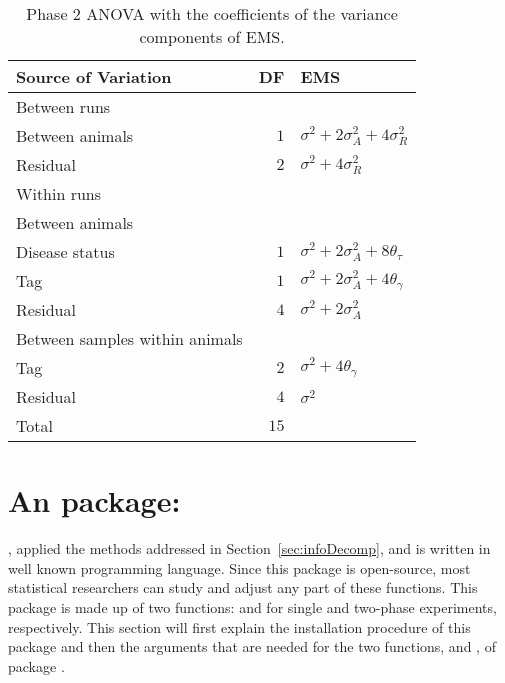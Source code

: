 \documentclass[article]{jss}
\begin{document}
\begin{table}[ht]
\centering
\caption{Phase 2 ANOVA with the coefficients of the variance components of EMS.}
\begin{tabular}[t]{lrl}
\hline
\multicolumn{1}{l}{Source of Variation} & \multicolumn{1}{l}{DF} & \multicolumn{1}{l}{EMS}\\
\hline
Between runs 		\\
\hspace{3mm}Between animals & $1$ 	& $\sigma^2 + 2\sigma_{A}^2 + 4\sigma_{R}^2$\\
\hspace{3mm}Residual		& $2$ 	& $\sigma^2 + 4\sigma_{R}^2$\\
\hline
Within runs 				\\
\hspace{3mm}Between animals \\
\hspace{6mm}Disease status  & $1$ 	& $\sigma^2 + 2\sigma_{A}^2 + 8\theta_{\tau}$\\
\hspace{6mm}Tag				& $1$ 	& $\sigma^2 + 2\sigma_{A}^2 + 4\theta_{\gamma}$\\
\hspace{6mm}Residual		& $4$ 	& $\sigma^2 + 2\sigma_{A}^2$\\
\hspace{3mm}Between samples within animals		&\\
\hspace{6mm}Tag				& $2$ 	& $\sigma^2 + 4\theta_{\gamma}$\\
\hspace{6mm}Residual		& $4$ 	& $\sigma^2$\\
\hline
Total 						& $15$      & \\
\hline
\end{tabular}
\label{tab:Phase2ANOVA}
\end{table}

\section[InfoDecompuTE]{An  package: } \label{sec:package}
, applied the methods addressed in Section~\ref{sec:infoDecomp}, and is written in well known  programming language. Since this package is open-source, most statistical researchers can study and adjust any part of these functions. This package is made up of two functions:  and  for single and two-phase experiments, respectively. This section will first explain the installation procedure of this package and then the arguments that are needed for the two functions,  and , of package .
\end{document}
